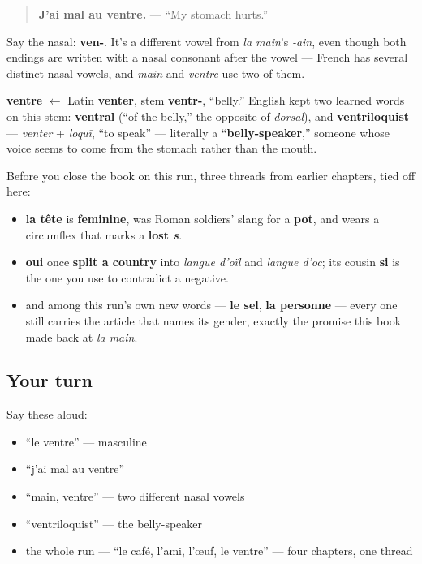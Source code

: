 \begin{quote}
\textbf{J'ai mal au ventre.} — \textquotedblleft{}My stomach hurts.\textquotedblright{}
\end{quote}

Say the nasal: \textbf{ven-}. It's a different vowel from \emph{la main}'s \emph{-ain}, even though both endings are written with a nasal consonant after the vowel — French has several distinct nasal vowels, and \emph{main} and \emph{ventre} use two of them.

\begin{cousinweb}
\textbf{ventre} $\leftarrow$ Latin \textbf{venter}, stem \textbf{ventr-}, \textquotedblleft{}belly.\textquotedblright{} English kept two learned words on this stem: \textbf{ventral} (\textquotedblleft{}of the belly,\textquotedblright{} the opposite of \emph{dorsal}), and \textbf{ventriloquist} — \emph{venter} + \emph{loquī}, \textquotedblleft{}to speak\textquotedblright{} — literally a \textquotedblleft{}\textbf{belly-speaker},\textquotedblright{} someone whose voice seems to come from the stomach rather than the mouth.
\end{cousinweb}

\begin{grammarlens}[title={Grammar Lens: five chapters, tied off}]
Before you close the book on this run, three threads from earlier chapters, tied off here:

\begin{itemize}
\raggedright
  \item \textbf{la tête} is \textbf{feminine}, was Roman soldiers' slang for a \textbf{pot}, and wears a circumflex that marks a \textbf{lost \emph{s}}.
  \item \textbf{oui} once \textbf{split a country} into \emph{langue d'oïl} and \emph{langue d'oc}; its cousin \textbf{si} is the one you use to contradict a negative.
  \item and among this run's own new words — \textbf{le sel}, \textbf{la personne} — every one still carries the article that names its gender, exactly the promise this book made back at \emph{la main}.
\end{itemize}
\end{grammarlens}

\subsection*{Your turn}
Say these aloud:

\begin{itemize}
\raggedright
  \item \textquotedblleft{}le ventre\textquotedblright{} — masculine
  \item \textquotedblleft{}j'ai mal au ventre\textquotedblright{}
  \item \textquotedblleft{}main, ventre\textquotedblright{} — two different nasal vowels
  \item \textquotedblleft{}ventriloquist\textquotedblright{} — the belly-speaker
  \item the whole run — \textquotedblleft{}le café, l'ami, l'œuf, le ventre\textquotedblright{} — four chapters, one thread
\end{itemize}

